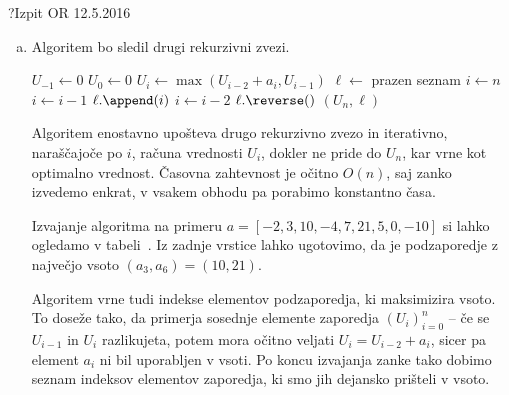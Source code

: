 \begin{naloga}{?}{Izpit OR 12.5.2016}
\begin{odgovor}
\begin{enumerate}[(a)]
Vrstni red iskanja vrednosti $U_i$ določimo z naraščajočim zaporedjem indeksov $i$, ko $1\leq i \leq n$, 
saj imamo tako pred reševanjem problema $U_i$
definirane vse predhodne vrednosti.
Ko izračunamo vse vrednosti $U_i$,
je maksimum vsote zaporedja enak $U^* = U_n$,
kar sledi neposredno iz definicije vrednosti $U_n$.

\item Algoritem bo sledil drugi rekurzivni zvezi.

\begin{small}
\begin{algorithmic}
	\State $U_{-1} \gets 0$
	\State $U_0 \gets 0$
		\State $U_i \gets \max(U_{i-2} + a_i, U_{i-1})$
	\EndFor
    \State $\ell \gets$ prazen seznam
    \State $i \gets n$
            \State $i \gets i-1$
        \Else
            \State $\ell.\append(i)$
            \State $i \gets i-2$
        \EndIf
    \EndWhile
    \State $\ell.\reverse()$
	\State \Return $(U_n, \ell)$
\EndFunction
\end{algorithmic}
\end{small}

Algoritem enostavno upošteva drugo rekurzivno zvezo in iterativno,
naraščajoče po $i$,
računa vrednosti $U_i$, dokler ne pride do $U_n$,
kar vrne kot optimalno vrednost.
Časovna zahtevnost je očitno $O(n)$, saj zanko izvedemo enkrat,
v vsakem obhodu pa porabimo konstantno časa.

Izvajanje algoritma na primeru $a = [-2, 3, 10, -4, 7, 21, 5, 0, -10]$
si lahko ogledamo v tabeli~\tab.
Iz zadnje vrstice lahko ugotovimo,
da je podzaporedje z največjo vsoto $(a_3, a_6) = (10, 21)$.

Algoritem vrne tudi indekse elementov podzaporedja, ki maksimizira vsoto.
To doseže tako, da primerja sosednje elemente zaporedja $(U_i)_{i=0}^n$
-- če se $U_{i-1}$ in $U_i$ razlikujeta,
potem mora očitno veljati $U_i = U_{i-2} + a_i$,
sicer pa element $a_i$ ni bil uporabljen v vsoti.
Po koncu izvajanja zanke tako dobimo seznam indeksov elementov zaporedja,
ki smo jih dejansko prišteli v vsoto.
\end{enumerate}


\end{odgovor}
\end{naloga}
